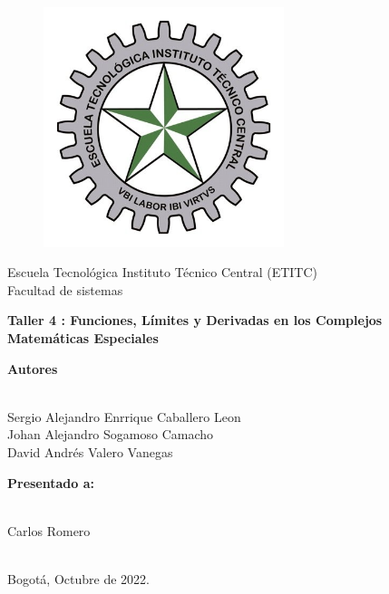 \documentclass[a4paper,11pt,openany]{book}
\begin{document}
\begin{titlepage}
 
\begin{center}
\vspace*{-1in}
\begin{figure}[htb]
\begin{center}
\includegraphics[width=7cm]{ETITC.png}
\end{center}
\end{figure}

{\sc \huge Escuela Tecnológica Instituto Técnico Central (ETITC)}\\
\vspace*{0.15in}
Facultad de sistemas\\
\vspace*{0.6in}
\begin{Large}
\textbf{Taller 4 : Funciones, Límites y Derivadas en los Complejos} \\
\textbf{Matem{\'a}ticas Especiales}\\
\end{Large}
\vspace*{0.3in}
\begin{large}
{\bf Autores} \\
 
\ 
 
Sergio Alejandro Enrrique Caballero Leon\\ 
Johan Alejandro Sogamoso Camacho \\
David Andrés Valero Vanegas \\
\end{large}
\vspace*{0.3in}
 
\end{center}
 
\begin{center}
{\bf Presentado a:} \\
 
\ 
 
Carlos Romero \\
 
\
 
Bogot{\'a}, Octubre de 2022.
\end{center}
 
\end{titlepage}
\end{document}
